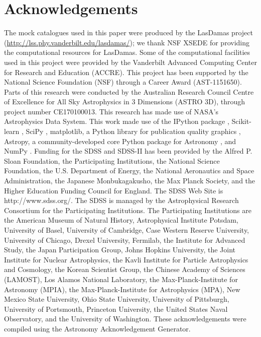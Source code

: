 \documentclass[useAMS,usenatbib, usedcolumn]{mnras}
\begin{document}
\section{Acknowledgements}\label{sec:acknowledments}

The mock catalogues used in this paper were produced by the LasDamas project 
(\url{http://lss.phy.vanderbilt.edu/lasdamas/}); we thank NSF XSEDE for 
providing the computational resources for LasDamas. Some of the 
computational facilities used in this project were provided by the 
Vanderbilt Advanced Computing Center for Research and Education (ACCRE). 
This project has been supported by the National Science Foundation (NSF) 
through a Career Award (AST-1151650). 
Parts of this research were conducted by the Australian Research Council 
Centre of Excellence for All Sky Astrophysics in 3 Dimensions (ASTRO 3D), 
through project number CE170100013.
This research has made use of 
NASA's Astrophysics Data System. This work made use of the IPython package 
\citep{Perez2007}, Scikit-learn \citep{McKinney2010}, SciPy 
\citep{jones_scipy_2001}, matplotlib, a Python library for publication 
quality graphics \citep{Hunter:2007}, Astropy, a community-developed 
core Python package for Astronomy \citep{AstropyCollaboration2013}, and 
NumPy \citep{VanDerWalt2011}. Funding for the SDSS and SDSS-II has been 
provided by the Alfred P. Sloan Foundation, the Participating Institutions, 
the National Science Foundation, the U.S. Department of Energy, 
the National Aeronautics and Space Administration, the 
Japanese Monbukagakusho, the Max Planck Society, and the Higher Education 
Funding Council for England. The SDSS Web Site is http://www.sdss.org/. 
The SDSS is managed by the Astrophysical Research Consortium for the 
Participating Institutions. The Participating Institutions are the 
American Museum of Natural History, Astrophysical Institute Potsdam, 
University of Basel, University of Cambridge, Case Western Reserve 
University, University of Chicago, Drexel University, Fermilab, the 
Institute for Advanced Study, the Japan Participation Group, 
Johns Hopkins University, the Joint Institute for Nuclear Astrophysics, 
the Kavli Institute for Particle Astrophysics and Cosmology, 
the Korean Scientist Group, the Chinese Academy of Sciences (LAMOST), 
Los Alamos National Laboratory, the Max-Planck-Institute for Astronomy (MPIA), 
the Max-Planck-Institute for Astrophysics (MPA), 
New Mexico State University, Ohio State University, 
University of Pittsburgh, University of Portsmouth, Princeton University, 
the United States Naval Observatory, and the University of Washington. 
These acknowledgements were compiled using the Astronomy Acknowledgement 
Generator.

% 



\bsp	%
\label{lastpage}
\end{document}
